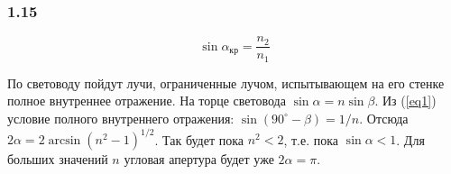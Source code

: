 \subsubsection*{1.15}

\begin{equation}\label{eq1} 
	\sin \alpha_{кр} = \frac{n_2}{n_1}
\end{equation}

По световоду пойдут лучи, ограниченные лучом, испытывающем на его стенке полное внутреннее отражение. На торце световода $\sin \alpha = n \sin \beta$. Из (\ref{eq1}) условие полного внутреннего отражения: $\sin (90^{\circ} - \beta) = 1/n$. Отсюда  $2\alpha = 2 \arcsin(n^2 - 1)^{1/2}$. Так будет пока $n^2 < 2$, т.е. пока $\sin \alpha < 1$. Для больших значений $n$ угловая апертура будет уже $2\alpha = \pi$.